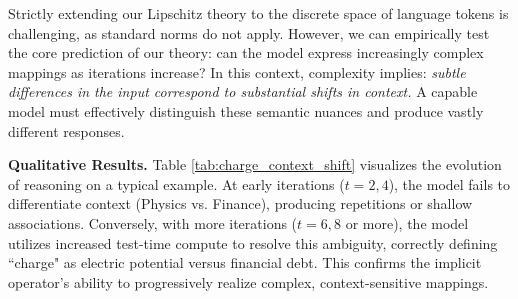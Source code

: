 \documentclass{amsart} %
\theoremstyle{definition}
\theoremstyle{remark}
\begin{document}
Strictly extending our Lipschitz theory to the discrete space of language tokens is challenging, as standard norms do not apply. However, we can empirically test the core prediction of our theory: can the model express increasingly complex mappings as iterations increase? In this context, complexity implies: \textit{subtle differences in the input correspond to substantial shifts in context.} A capable model must effectively distinguish these semantic nuances and produce vastly different responses.

\textbf{Qualitative Results.} Table \ref{tab:charge_context_shift} visualizes the evolution of reasoning on a typical example. At early iterations ($t=2, 4$), the model fails to differentiate context (Physics vs. Finance), producing repetitions or shallow associations. Conversely, with more iterations ($t=6,8$ or more), the model utilizes increased test-time compute to resolve this ambiguity, correctly defining ``charge" as electric potential versus financial debt. This confirms the implicit operator's ability to progressively realize complex, context-sensitive mappings.
\end{document}
